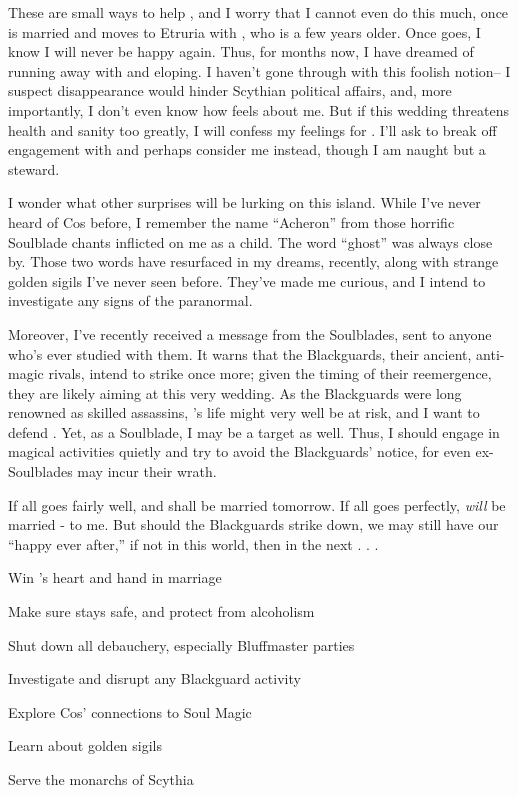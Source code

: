 \documentclass[char]{Kos}
\begin{document}
These are small ways to help \cBride{}, and I worry that I cannot even do this much, once \cBride{\they} is married and moves to Etruria with \cGroom{}, who is a few years older. Once \cBride{\they} goes, I know I will never be happy again. Thus, for months now, I have dreamed of running away with \cBride{} and eloping. I haven't gone through with this foolish notion-- I suspect \cBride{\their} disappearance would hinder Scythian political affairs, and, more importantly, I don't even know how \cBride{} feels about me. But if this wedding threatens \cBride{\their} health and sanity too greatly, I will confess my feelings for \cBride{\them}. I'll ask \cBride{\them} to break off \cBride{\their} engagement with \cGroom{} and perhaps consider me instead, though I am naught but a steward. 

I wonder what other surprises will be lurking on this island. While I've never heard of Cos before, I remember the name ``Acheron'' from those horrific Soulblade chants inflicted on me as a child. The word ``ghost'' was always close by. Those two words have resurfaced in my dreams, recently, along with strange golden sigils I've never seen before. They've made me curious, and I intend to investigate any signs of the paranormal.

Moreover, I've recently received a message from the Soulblades, sent to anyone who's ever studied with them. It warns that the Blackguards, their ancient, anti-magic rivals, intend to strike once more; given the timing of their reemergence, they are likely aiming at this very wedding. As the Blackguards were long renowned as skilled assassins, \cBride{}'s life might very well be at risk, and I want to defend \cBride{\them}. Yet, as a Soulblade, I may be a target as well. Thus, I should engage in magical activities quietly and try to avoid the Blackguards' notice, for even ex-Soulblades may incur their wrath.

If all goes fairly well, \cBride{} and \cGroom{} shall be married tomorrow. If all goes perfectly, \cBride{} \emph{will} be married - to me. But should the Blackguards strike \cBride{\them} down, we may still have our ``happy ever after,'' if not in this world, then in the next . . .


\begin{itemz}[Goals]
 \item Win \cBride{}'s heart and \cBride{\their} hand in marriage
 \item Make sure \cBride{} stays safe, and protect \cBride{\them} from alcoholism
 \item Shut down all debauchery, especially Bluffmaster parties
 \item Investigate and disrupt any Blackguard activity
 \item Explore Cos' connections to Soul Magic
 \item Learn about golden sigils
 \item Serve the monarchs of Scythia
\end{itemz}
\end{document}
